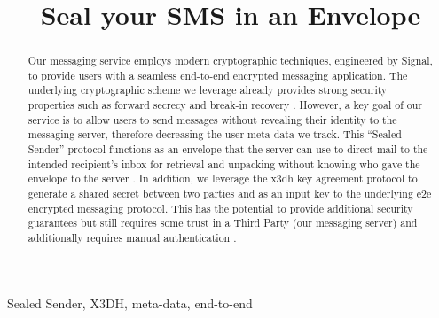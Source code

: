 \documentclass[conference]{IEEEtran}
\begin{document}
\title{Seal your SMS in an Envelope}


\author{
\and
{}
\and
{}
\and
{}
}

\maketitle

\begin{abstract}

Our messaging service employs modern cryptographic techniques, engineered by Signal, to provide users with a seamless end-to-end encrypted messaging application. The underlying cryptographic scheme we leverage already provides strong security properties such as forward secrecy and break-in recovery \cite{https://www.signal.org/docs/specifications/doubleratchet/}. However, a key goal of our service is to allow users to send messages without revealing their identity to the messaging server, therefore decreasing the user meta-data we track. This “Sealed Sender” protocol functions as an envelope that the server can use to direct mail to the intended recipient's inbox for retrieval and unpacking without knowing who gave the envelope to the server \cite{https://signal.org/blog/sealed-sender/}. In addition, we leverage the x3dh key agreement protocol to generate a shared secret between two parties and as an input key to the underlying e2e encrypted messaging protocol. This has the potential to provide additional security guarantees but still requires some trust in a Third Party (our messaging server) and additionally requires manual authentication \cite{https://signal.org/docs/specifications/x3dh/}.  
\newline

\end{abstract}


\begin{IEEEkeywords}
Sealed Sender, X3DH, meta-data, end-to-end
\end{IEEEkeywords}
\end{document}
